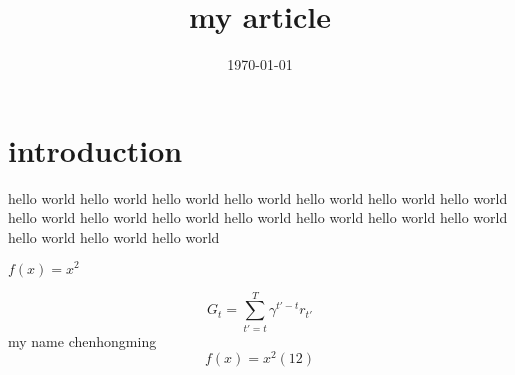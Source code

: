 \documentclass{article}
\title{my article}
\date{\today}
\begin{document}
\maketitle
\section{introduction}

hello world\cite{sutton1998}
hello world\cite{sutton2017}
hello world\cite{Rummery1}
hello world
hello world
hello world
hello world
hello world
hello world
hello world
hello world
hello world
hello world
hello world
hello world
hello world
hello world

$f(x)=x^2$

    \begin{equation}
    G_{t}=\sum_{{t}'=t}^{T}\gamma ^{{t}'-t}r_{{t}'}
    \end{equation}
my name chenhongming$$f(x)=x^2(12)$$%
\nocite{*}%

\end{document}
